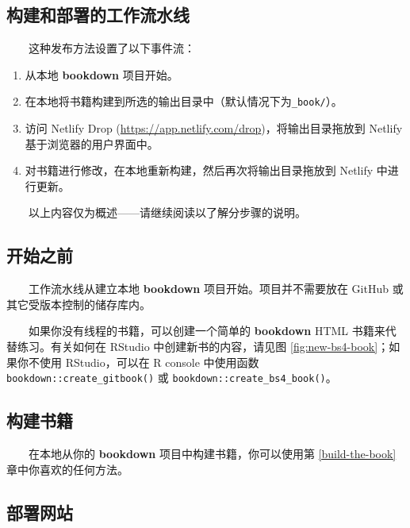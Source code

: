 \documentclass[
  12pt,
]{krantz}
\providecommand{\tightlist}{%
  \setlength{\itemsep}{0pt}\setlength{\parskip}{0pt}}
\theoremstyle{definition}
\theoremstyle{definition}
\theoremstyle{definition}
\theoremstyle{definition}
\theoremstyle{remark}
\begin{document}
\hypertarget{ux6784ux5efaux548cux90e8ux7f72ux7684ux5de5ux4f5cux6d41ux6c34ux7ebf}{%
\subsection{构建和部署的工作流水线}\label{ux6784ux5efaux548cux90e8ux7f72ux7684ux5de5ux4f5cux6d41ux6c34ux7ebf}}

  这种发布方法设置了以下事件流：

\begin{enumerate}
\def\labelenumi{\arabic{enumi}.}
\tightlist
\item
  从本地 \textbf{bookdown} 项目开始。
\item
  在本地将书籍构建到所选的输出目录中（默认情况下为\texttt{\_book/}）。
\item
  访问 Netlify Drop (\url{https://app.netlify.com/drop})，将输出目录拖放到 Netlify 基于浏览器的用户界面中。
\item
  对书籍进行修改，在本地重新构建，然后再次将输出目录拖放到 Netlify 中进行更新。
\end{enumerate}

  以上内容仅为概述------请继续阅读以了解分步骤的说明。

\hypertarget{ux5f00ux59cbux4e4bux524d}{%
\subsection{开始之前}\label{ux5f00ux59cbux4e4bux524d}}

  工作流水线从建立本地 \textbf{bookdown} 项目开始。项目并不需要放在 GitHub 或其它受版本控制的储存库内。

  如果你没有线程的书籍，可以创建一个简单的 \textbf{bookdown} HTML 书籍来代替练习。有关如何在 RStudio 中创建新书的内容，请见图 \ref{fig:new-bs4-book}；如果你不使用 RStudio，可以在 R console 中使用函数 \texttt{bookdown::create\_gitbook()} 或 \texttt{bookdown::create\_bs4\_book()}。

\hypertarget{ux6784ux5efaux4e66ux7c4d}{%
\subsection{构建书籍}\label{ux6784ux5efaux4e66ux7c4d}}

  在本地从你的 \textbf{bookdown} 项目中构建书籍，你可以使用第 \ref{build-the-book} 章中你喜欢的任何方法。

\hypertarget{ux90e8ux7f72ux7f51ux7ad9}{%
\subsection{部署网站}\label{ux90e8ux7f72ux7f51ux7ad9}}
\end{document}
